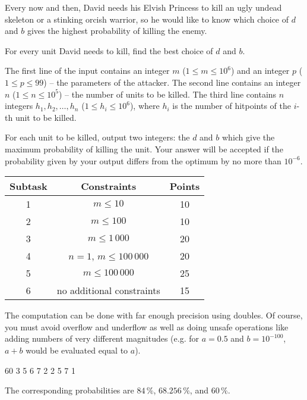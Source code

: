 Every now and then, David needs his Elvish Princess to kill an ugly undead skeleton or a stinking orcish warrior,
so he would like to know which choice of $d$ and $b$ gives the highest probability of killing the enemy.


For every unit David needs to kill, find the best choice of $d$ and $b$.


The first line of the input contains an integer $m$ ($1\leq m\leq 10^6$)
and an integer $p$ ($1\leq p\leq 99$) -- the parameters of the attacker.
The second line contains an integer $n$ ($1\leq n\leq 10^5$) -- the number of units to be killed.
The third line contains $n$ integers $h_1,h_2,\dots,h_n$ ($1\leq h_i\leq 10^6$),
where $h_i$ is the number of hitpoints of the $i$-th unit to be killed.



For each unit to be killed, output two integers: the $d$ and $b$ which give the maximum probability of killing the unit.
Your answer will be accepted if the probability given by your output differs from the optimum by no more than $10^{-6}$.


\begin{tabular}{|c|c|c|}
	\hline
	Subtask & Constraints  & Points \\
	\hline
	1 & $m \leq 10$ & 10 \\
	\hline
	2 & $m \leq 100$ & 10 \\
	\hline
	3 & $m \leq 1\,000$ & 20 \\
	\hline
	4 & $n=1$, $m\leq 100\,000$ & 20 \\
	\hline
	5 & $m \leq 100\,000$ & 25 \\
	\hline
	6 & no additional constraints & 15 \\
	\hline
\end{tabular}


The computation can be done with far enough precision using doubles.
Of course, you must avoid overflow and underflow as well as doing unsafe operations
like adding numbers of very different magnitudes (e.g. for $a=0.5$ and $b=10^{-100}$,
$a+b$ would be evaluated equal to $a$).


 60
3
5 6 7
 2
2 5
7 1

\sampleEND

The corresponding probabilities are $84\,\%$, $68.256\,\%$, and $60\,\%$.

